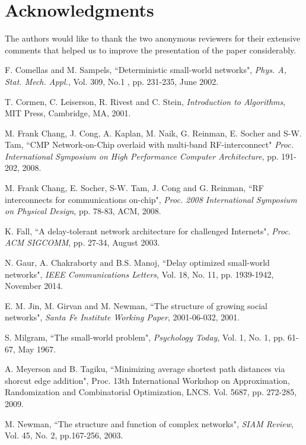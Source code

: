 \documentclass[journal,final,twocolumn,10pt,twoside]{IEEEtranTCOM}
\begin{document}
\section{Acknowledgments}

The authors would like to thank the two anonymous reviewers for their extensive comments that helped us to improve the 
presentation of the paper considerably. 

\begin{thebibliography}{1}

F. Comellas and M. Sampels, ``Deterministic small-world networks", 
{\em Phys. A, Stat. Mech. Appl.}, Vol. 309, No.1 , pp. 231-235, June 2002. 


T. Cormen, C. Leiserson, R. Rivest and C. Stein, {\em Introduction to Algorithms}, 
 MIT Press, Cambridge, MA, 2001. 

M. Frank Chang, J. Cong, A. Kaplan, M. Naik, G. Reinman, E. Socher and 
S-W. Tam,
``CMP Network-on-Chip overlaid with multi-band RF-interconnect"
{\em Proc. International Symposium on High Performance Computer Architecture},
pp. 191-202, 2008. 

M. Frank Chang, E. Socher, S-W. Tam, J. Cong and G. Reinman, 
``RF interconnects for communications on-chip", 
{\em Proc. 2008 International Symposium on Physical Design}, 
pp. 78-83, ACM, 2008.  

K. Fall, ``A delay-tolerant network architecture for challenged Internets", 
{\em Proc. ACM SIGCOMM}, pp. 27-34, August 2003. 

N. Gaur, A. Chakraborty and B.S. Manoj,
``Delay optimized small-world networks",
{\em IEEE Communications Letters}, Vol. 18, No. 11, pp. 1939-1942, November 2014.

E. M. Jin, M. Girvan and M. Newman, 
``The structure of growing social networks",
{\em Santa Fe Institute Working Paper}, 2001-06-032, 2001. 

S. Milgram, ``The small-world problem", {\em Psychology Today}, Vol. 1, No. 1, 
pp. 61-67, May 1967. 

A. Meyerson and B. Tagiku, ``Minimizing average shortest path distances via shorcut edge
addition", {Proc. 13th International Workshop on Approximation, Randomization and Combinatorial
Optimization}, LNCS. Vol. 5687, pp. 272-285, 2009.

M. Newman,
``The structure and function of complex networks",
{\em SIAM Review}, Vol. 45, No. 2, pp.167-256, 2003. 



\end{thebibliography}
\end{document}
